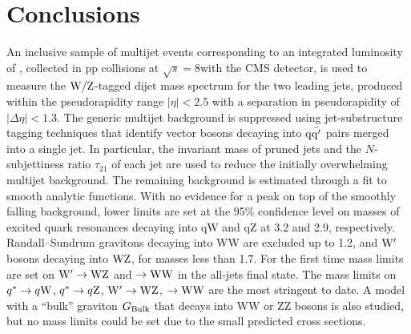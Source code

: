 \section{Conclusions}
\label{sec:conclusions1}


An inclusive sample of multijet events corresponding to an integrated
luminosity of \intlumi, collected in pp collisions at
$\sqrt{s}=8$\TeVcc with the CMS detector, is used to measure the
${\rm W}/{\rm Z}$-tagged dijet mass spectrum for the two leading jets,
produced within the pseudorapidity range $|{\eta}| < 2.5$ with a
separation in pseudorapidity of $|{\Delta\eta}| < 1.3$. The generic
multijet background is suppressed using jet-substructure tagging
techniques that identify vector bosons decaying into ${\rm q\bar{q'}}$ pairs
merged into a single jet. In particular, the invariant mass of pruned
jets and the $N$-subjettiness ratio $\tau_{21}$ of each jet are used
to reduce the initially overwhelming multijet background. The
remaining background is estimated through a fit to smooth analytic
functions. With no evidence for a peak on top of the smoothly falling
background, lower limits are set at the 95\% confidence level on
masses of excited quark resonances decaying into qW and qZ at 3.2 and
2.9\TeVcc, respectively. Randall--Sundrum gravitons \GRS decaying into
WW are excluded up to 1.2\TeVcc, and $\mathrm{W}^{\prime}$ bosons decaying into
${\rm W}{\rm Z}$, for masses less than 1.7\TeVcc.  For the first time mass
limits are set on $\mathrm{W}^{\prime}\to {\rm W}{\rm Z}$ and \GRS $\to {\rm W}{\rm W}$ in the
all-jets final state. The mass limits on $q^*\to q{\rm W}$, $q^*\to
q{\rm Z}$, $\mathrm{W}^{\prime}\to {\rm W}{\rm Z}$, \GRS$\to {\rm W}{\rm W}$ are the most stringent
to date.  A model with a ``bulk'' graviton $G_\mathrm{Bulk}$ that decays into
WW or ZZ bosons is also studied, but no mass limits could be set due
to the small predicted cross sections.

